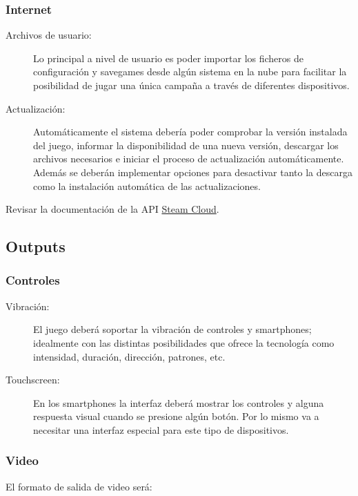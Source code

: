 \subsubsection{Internet}\label{io:inputs-internet}
\begin{description}
\item[Archivos de usuario:] Lo principal a nivel de usuario es poder importar los ficheros de configuración y savegames desde algún sistema en la nube para facilitar la posibilidad de jugar una única campaña a través de diferentes dispositivos.

\item[Actualización:] Automáticamente el sistema debería poder comprobar la versión instalada del juego, informar la disponibilidad de una nueva versión, descargar los archivos necesarios e iniciar el proceso de actualización automáticamente. Además se deberán implementar opciones para desactivar tanto la descarga como la instalación automática de las actualizaciones.
\end{description}

Revisar la documentación de la API \href{https://partner.steamgames.com/doc/features/cloud}{Steam Cloud}.

\subsection{Outputs}\label{io:outputs}

\subsubsection{Controles}\label{io:output-controles}
\begin{description}
\item[Vibración:] El juego deberá soportar la vibración de controles y smartphones; idealmente con las distintas posibilidades que ofrece la tecnología como intensidad, duración, dirección, patrones, etc.

\item[Touchscreen:] En los smartphones la interfaz deberá mostrar los controles y alguna respuesta visual cuando se presione algún botón. Por lo mismo va a necesitar una interfaz especial para este tipo de dispositivos.
\end{description}

\subsubsection{Video}\label{io:output-video}
\noindent El formato de salida de video será:

